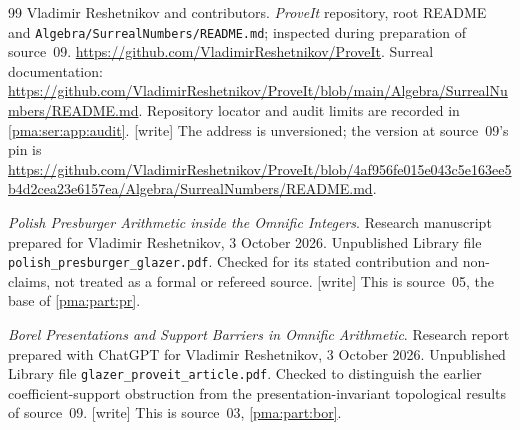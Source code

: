 \documentclass[11pt]{article}
\numberwithin{equation}{section}
\theoremstyle{definition}
\theoremstyle{remark}
\newcommand{\writetag}{\textup{\textsf{\small[write]}}}
\begin{document}
\begin{thebibliography}{99}
Vladimir Reshetnikov and contributors.
\emph{ProveIt} repository, root README and
\texttt{Algebra/SurrealNumbers/README.md}; inspected during preparation of
source~09.
\url{https://github.com/VladimirReshetnikov/ProveIt}.
Surreal documentation:
\url{https://github.com/VladimirReshetnikov/ProveIt/blob/main/Algebra/SurrealNumbers/README.md}.
Repository locator and audit limits are recorded in \cref{pma:ser:app:audit}.
\writetag{} The address is unversioned; the version at source~09's pin is
\url{https://github.com/VladimirReshetnikov/ProveIt/blob/4af956fe015e043c5e163ee5b4d2cea23e6157ea/Algebra/SurrealNumbers/README.md}.

\emph{Polish Presburger Arithmetic inside the Omnific Integers}.
Research manuscript prepared for Vladimir Reshetnikov, 3 October 2026.
Unpublished Library file \texttt{polish\_presburger\_glazer.pdf}.
Checked for its stated contribution and non-claims, not treated as a formal
or refereed source. \writetag{} This is source~05, the base of
\cref{pma:part:pr}.

\emph{Borel Presentations and Support Barriers in Omnific Arithmetic}.
Research report prepared with ChatGPT for Vladimir Reshetnikov,
3 October 2026.
Unpublished Library file \texttt{glazer\_proveit\_article.pdf}.
Checked to distinguish the earlier coefficient-support obstruction from the
presentation-invariant topological results of source~09. \writetag{} This is
source~03, \cref{pma:part:bor}.

\end{thebibliography}
\end{document}
